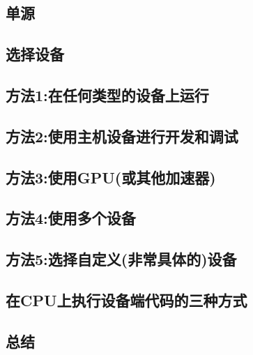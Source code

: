 \documentclass[11pt,a4paper,UTF8]{ctexart}
\begin{document}
		\subsection{单源}
		\subsection{选择设备}
		\subsection{方法1:在任何类型的设备上运行}
		\subsection{方法2:使用主机设备进行开发和调试}
		\subsection{方法3:使用GPU(或其他加速器)}
		\subsection{方法4:使用多个设备}
		\subsection{方法5:选择自定义(非常具体的)设备}
		\subsection{在CPU上执行设备端代码的三种方式}
		\subsection{总结}
\end{document}
